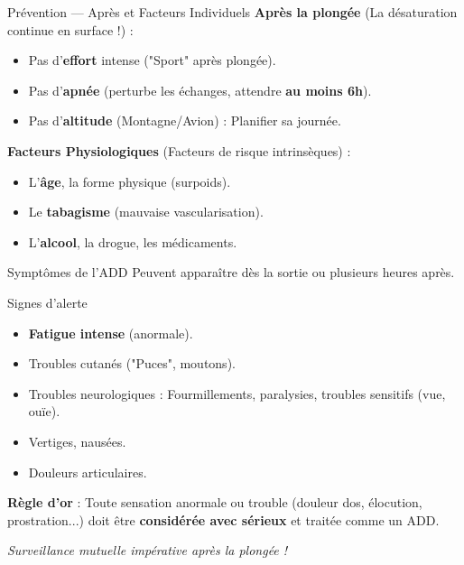 \begin{frame}{Prévention — Après et Facteurs Individuels}
    \textbf{Après la plongée} (La désaturation continue en surface !) :
    \begin{itemize}
        \item Pas d'\textbf{\textcolor{ffessmred}{effort}} intense ("Sport" après plongée).
        \item Pas d'\textbf{\textcolor{ffessmred}{apnée}} (perturbe les échanges, attendre \textbf{au moins 6h}).
        \item Pas d'\textbf{\textcolor{ffessmred}{altitude}} (Montagne/Avion) : Planifier sa journée.
    \end{itemize}
    
    \vspace{0.5em}
    \textbf{Facteurs Physiologiques} (Facteurs de risque intrinsèques) :
    \begin{itemize}
        \item L'\textbf{\textcolor{ffessmred}{âge}}, la forme physique (surpoids).
        \item Le \textbf{\textcolor{ffessmred}{tabagisme}} (mauvaise vascularisation).
        \item L'\textbf{\textcolor{ffessmred}{alcool}}, la drogue, les médicaments.
    \end{itemize}
\end{frame}

\begin{frame}{Symptômes de l'ADD}
    Peuvent apparaître dès la sortie ou plusieurs heures après.
    
    \begin{alertblock}{Signes d'alerte}
        \begin{itemize}
            \item \textbf{Fatigue intense} (anormale).
            \item Troubles cutanés ("Puces", moutons).
            \item Troubles neurologiques : Fourmillements, paralysies, troubles sensitifs (vue, ouïe).
            \item Vertiges, nausées.
            \item Douleurs articulaires.
        \end{itemize}
        \textbf{\textcolor{ffessmred}{Règle d'or}} : Toute sensation anormale ou trouble (douleur dos, élocution, prostration...) 
        doit être \textbf{\textcolor{ffessmred}{considérée avec sérieux}} et traitée comme un ADD.
    \end{alertblock}
    \textit{Surveillance mutuelle impérative après la plongée !}
\end{frame}


